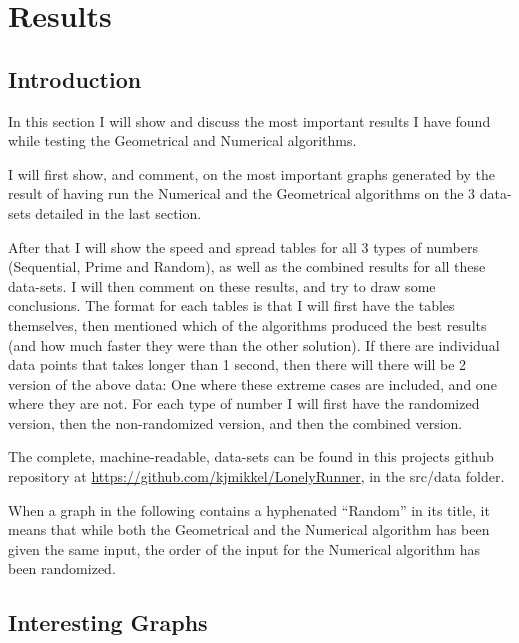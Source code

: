\section{Results}
\label{results}

\subsection{Introduction}
In this section I will show and discuss the most important results I have found while testing the Geometrical and Numerical algorithms. 

I will first show, and comment, on the most important graphs generated by the result of having run the Numerical and the Geometrical algorithms on the 3 data-sets detailed in the last section.

After that I will show the speed and spread tables for all 3 types of numbers (Sequential, Prime and Random), as well as the combined results for all these data-sets. I will then comment on these results, and try to draw some conclusions. The format for each tables is that I will first have the tables themselves, then mentioned which of the algorithms produced the best results (and how much faster they were than the other solution). If there are individual data points that takes longer than 1 second, then there will there will be 2 version of the above data: One where these extreme cases are included, and one where they are not. For each type of number I will first have the randomized version, then the non-randomized version, and then the combined version.

The complete, machine-readable, data-sets can be found in this projects github repository at \underline{https://github.com/kjmikkel/LonelyRunner}, in the src/data folder.

When a graph in the following contains a hyphenated ``Random'' in its title, it means that while both the Geometrical and the Numerical algorithm has been given the same input, the order of the input for the Numerical algorithm has been randomized. 

\subsection{Interesting Graphs}

